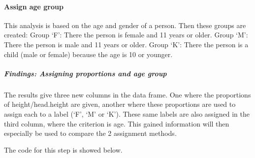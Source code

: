 \documentclass[]{article}
\newenvironment{Shaded}{\begin{snugshade}}{\end{snugshade}}
\newcommand{\CommentTok}[1]{\textcolor[rgb]{0.56,0.35,0.01}{\textit{#1}}}
\newcommand{\DataTypeTok}[1]{\textcolor[rgb]{0.13,0.29,0.53}{#1}}
\newcommand{\DecValTok}[1]{\textcolor[rgb]{0.00,0.00,0.81}{#1}}
\newcommand{\KeywordTok}[1]{\textcolor[rgb]{0.13,0.29,0.53}{\textbf{#1}}}
\newcommand{\NormalTok}[1]{#1}
\newcommand{\OperatorTok}[1]{\textcolor[rgb]{0.81,0.36,0.00}{\textbf{#1}}}
\newcommand{\StringTok}[1]{\textcolor[rgb]{0.31,0.60,0.02}{#1}}
\begin{document}
\paragraph{Assign age group}
\label{sec:appendix-assign-age-group}

This analysis is based on the age and gender of a person. Then these
groups are created: Group `F': There the person is female and 11 years
or older. Group `M': There the person is male and 11 years or older.
Group `K': There the person is a child (male or female) because the age
is 10 or younger.

\subparagraph{Findings: Assigning proportions and age group}
\label{sec:appendix-findings-assign-age-group}

The results give three new columns in the data frame. One where the
proportions of height/head.height are given, another where these
proportions are used to assign each to a label (`F', `M' or `K'). These
same labels are also assigned in the third column, where the criterion
is age. This gained information will then especially be used to compare
the 2 assignment methods.

The code for this step is showed below.

\begin{Shaded}
\end{Shaded}
\end{document}
